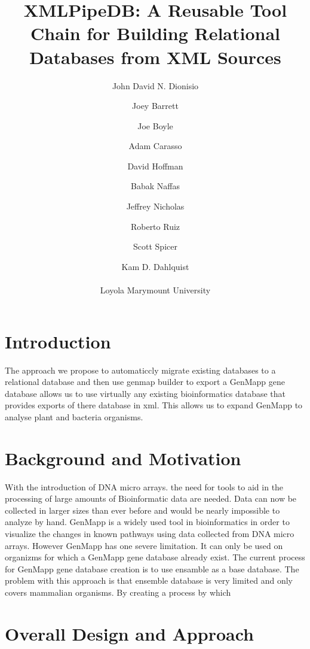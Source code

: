 \documentclass[11pt]{article}
\title{XMLPipeDB: A Reusable Tool Chain for Building Relational Databases from XML Sources}
\author{
John David N. Dionisio \and
Joey Barrett \and
Joe Boyle \and
Adam Carasso \and
David Hoffman \and
Babak Naffas \and
Jeffrey Nicholas \and
Roberto Ruiz \and
Scott Spicer \and
Kam D. Dahlquist\\
\\
Loyola Marymount University
}
\begin{document}
\maketitle


\section{Introduction}
  The approach we propose to automaticcly migrate existing databases to a relational database and then use genmap builder to export a GenMapp gene database allows us to use virtually any existing bioinformatics database that provides exports of there database in xml.  This allows us to expand GenMapp to analyse plant and bacteria organisms.  



\section{Background and Motivation}
With the introduction of DNA micro arrays.  the need for tools to aid in the processing of large amounts of Bioinformatic data are needed.  Data can now be collected in larger sizes than ever before and would be nearly impossible to analyze by hand.  GenMapp is a widely used tool in bioinformatics in order to visualize the changes in known pathways using data collected from DNA micro arrays.  However GenMapp has one severe  limitation.  It can only be used on organizms for which a GenMapp gene database already exist.  The current process for GenMapp gene database creation is to use ensamble as a base database.   The problem with this approach is that ensemble database is very limited and only covers mammalian organisms.  By creating a process by which 
\cite{genmapp:ng} \cite{mappfinder:gb} \cite{genmapp:bax}

\section{Overall Design and Approach}
\end{document}
